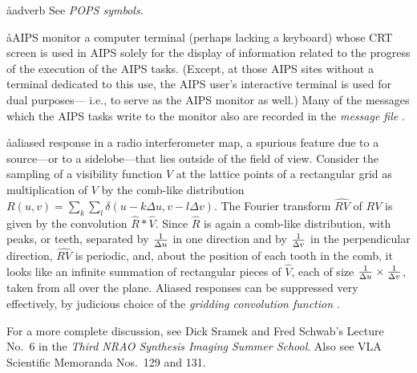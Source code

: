 \newcommand{\intii}{\int\!\!\int}
\def\operatorname#1{\mathop{\mathcode`'="7027 \mathcode`-="70
       \rm #1}\nolimits}                                              %
\def\arg{\operatorname{arg}}
\def\fti{\text{FT}^{-1}}
\def\hca{{\it H\"ogbom Clean algorithm}}
\def\wsp{{\it 1982 Summer Workshop Proceedings}}
\def\ssp{{\it 1985 Summer School Proceedings}}
\def\sira{{\it Third NRAO Synthesis Imaging Summer School}}
\def\sydp{{\it 1983 Sydney Conference Proceedings}}
\def\gronp{{\it 1978 Groningen Conference Proceedings}}
\def\CRn{{\footnotesize \hbox{\raise0.4ex\hbox{C}\hskip-.17em\lower0.4ex\hbox
      {R}}}}
\def\dotsc{\mathinner{\ldotp\ldotp\ldotp}}
\def\hatsymbol{{\mathchoice{\null}{\null}{\,\,\hbox{\lower 10pt\hbox
    {$\widehat{\null}$}}}{\,\hbox{\lower 20pt\hbox
       {$\hat{\null}$}}}}}

\footnotesize
\renewcommand{\parsdef}{0.5mm plus 0.5mm minus 0.5mm}
\pd
\parindent 13pt

\aa{adverb} See {\it POPS symbols.}

\aa{AIPS monitor}
a computer terminal (perhaps lacking a keyboard) whose CRT
screen is used in AIPS solely for the display of information
related to the progress of the execution of the AIPS tasks.
(Except, at those AIPS sites without a terminal dedicated to this use,
the AIPS user's interactive terminal is used for dual purposes---%
i.e., to serve as the AIPS monitor as well.)
Many of the messages which the AIPS tasks write to the monitor
also are recorded in the {\it message file} \qv.

\aa{aliased response}
in a radio interferometer map, a spurious feature due to
a source---or to a sidelobe---that lies outside of the field of view.
Consider the sampling of a visibility function $V$
at the lattice points of a rectangular grid
as multiplication of $V$ by the comb-like distribution
$R(u,v)=\sum_k\sum_l\delta(u-k\Delta u,v-l\Delta v)$.
The Fourier transform $\widehat {RV}$ of $RV$ is given
by the convolution $\hat R\ast\hat V$.
Since $\hat R$ is again a comb-like distribution, with
peaks, or teeth, separated by ${1\over\Delta u}$ in one direction
and by ${1\over\Delta v}$ in the perpendicular direction,
$\widehat {RV}$ is periodic,
and, about the position of each tooth in the comb,
it looks like an infinite summation of rectangular pieces of $\hat V$,
each of size ${1\over\Delta u}\times{1\over\Delta v}$,
taken from all over the plane.
Aliased responses can be suppressed very effectively, by judicious
choice of the {\it gridding convolution function} \qv.
\par
For a more complete discussion, see Dick Sramek and Fred Schwab's Lecture
No.~6 in the \sira.
Also see VLA Scientific Memoranda Nos.~129 and 131.

